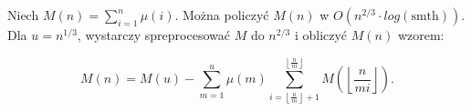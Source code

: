 
\usepackage[utf8]{inputenc}
\usepackage{polski}
\usepackage{amsfonts}


Niech $M(n) = \sum_{i = 1}^n \mu(i)$.
Można policzyć $M(n)$ w $O \left( n^{2/3} \cdot log(\textrm{smth}) \right)$.
Dla $u = n^{1 / 3}$, wystarczy spreprocesować $M$ do $n^{2 / 3}$
  i obliczyć $M(n)$ wzorem:

\[
  M(n) = M(u) - \sum_{m = 1}^u \mu(m)
      \sum_{i = \left\lfloor \frac{u}{m}
            \right\rfloor + 1}^{\left\lfloor \frac{n}{m} \right\rfloor}
         M \left( \left\lfloor \frac{n}{mi} \right\rfloor \right).
\]

